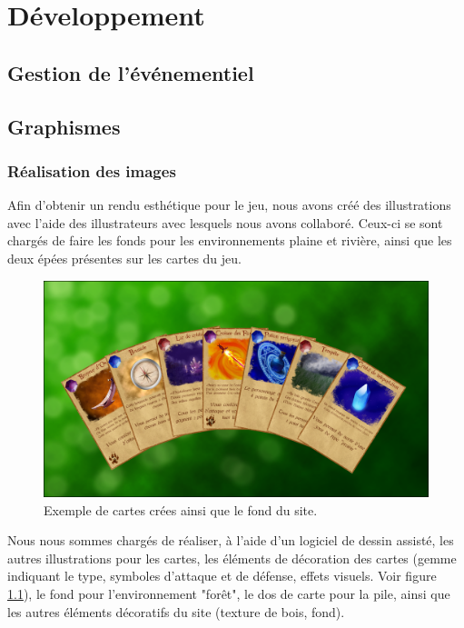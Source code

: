 \documentclass[12pt]{report}
\begin{document}
\chapter{Développement}
    
    \section{Gestion de l'événementiel}
    
    \section{Graphismes}
        
        \subsection{Réalisation des images}
        
        Afin d'obtenir un rendu esthétique pour le jeu, nous avons créé des illustrations avec l'aide des illustrateurs avec lesquels nous avons collaboré. Ceux-ci se sont chargés de faire les fonds pour les environnements plaine et rivière, ainsi que les deux épées présentes sur les cartes du jeu. 
        
        \begin{figure}[h!]
	       	\centering
           	\includegraphics[scale=0.4]{cards.png}
           	\caption{Exemple de cartes crées ainsi que le fond du site.}
           	\label{fig:cartes}
        \end{figure}
        
        Nous nous sommes chargés de réaliser, à l'aide d'un logiciel de dessin assisté, les autres illustrations pour les cartes, les éléments de décoration des cartes (gemme indiquant le type, symboles d'attaque et de défense, effets visuels. Voir figure \ref{fig:cartes}), le fond pour l'environnement "forêt", le dos de carte pour la pile, ainsi que les autres éléments décoratifs du site (texture de bois, fond).
        
\end{document}

